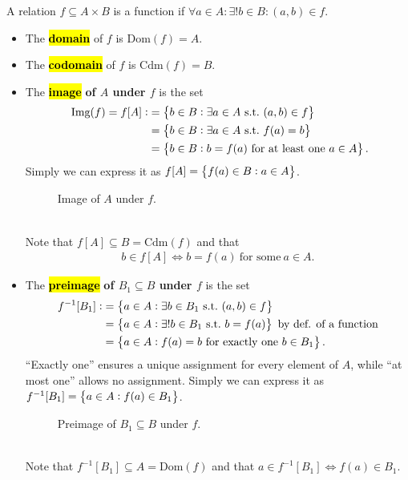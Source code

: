 \documentclass[11pt,openany]{article}
\begin{document}
\begin{remark*}
	A relation $f\subseteq A\times B$ is a function if $\boxed{\forall a\in A:\exists! b\in B:(a,b)\in f.}$
	\begin{itemize}
		\item The \hl{\textbf{domain}} of $f$ is $\text{Dom}(f)=A$.
		\item The \hl{\textbf{codomain}} of $f$ is $\text{Cdm}(f)=B$.
		\item The \hl{\textbf{image}} \textbf{of $A$ under $f$} is the set \begin{align*}\
			\img{f}=f[A]:&=\set{b\in B:\exists a \in A\ \text{s.t.}\ (a,b)\in f}\\
			&=\set{b\in B:\exists a \in A\ \text{s.t.}\ f(a)=b}\\
			&=\set{b\in B: b = f(a)\ \text{for at least one}\ a\in A}.
		\end{align*} Simply we can express it as $f[A]=\set{f(a)\in B:a\in A}$. 
		\begin{figure}[h!]\centering
			
			\caption{Image of $A$ under $f$.}
		\end{figure}\\
		Note that $f[A]\subseteq B=\text{Cdm}(f)$ and that \begin{align*}
			b\in f[A]\iff b=f(a)\ \text{for some}\ a\in A.
		\end{align*}
		\item The \hl{\textbf{preimage}} \textbf{of $B_1\subseteq B$ under $f$} is the set \begin{align*}
			f^{-1}[B_1]:&=\set{a\in A:\exists b \in B_1\ \text{s.t.}\ (a,b)\in f}\\
			&=\set{a\in A:\exists! b \in B_1\ \text{s.t.}\ b=f(a)}\ \text{by def. of a function}\\
			&=\set{a\in A:f(a)=b\ \text{for exactly one}\ b\in B_1}.
		\end{align*} ``Exactly one'' ensures a unique assignment for every element of $A$, while ``at most one'' allows no assignment. Simply we can express it as $f^{-1}[B_1]=\set{a\in A:f(a)\in B_1}$.
		\begin{figure}[h!]\centering
				
				\caption{Preimage of $B_1\subseteq B$ under $f$.}
			\end{figure}\\
		Note that $f^{-1}[B_1]\subseteq A=\text{Dom}(f)$ and that $a\in f^{-1}[B_1]\iff f(a)\in B_1.$
	\end{itemize}
\end{remark*}
\end{document}
